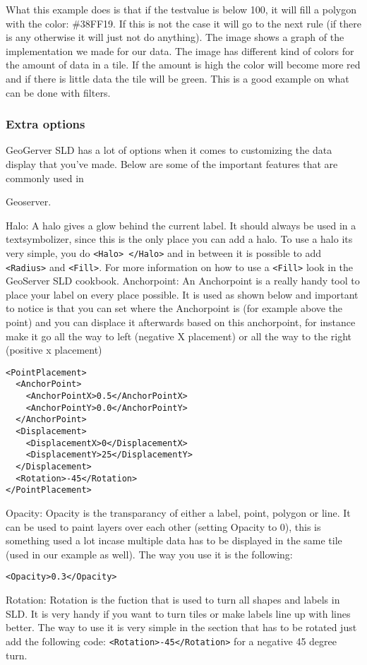 What this example does is that if the testvalue is below 100, it will fill a polygon with the color: \#38FF19. If this is not the case it will go to the next rule (if there is any otherwise it will just not do anything). The image shows a graph of the implementation we made for our data. The image has different kind of colors for the amount of data in a tile. If the amount is high the color will become more red and if there is little data the tile will be green. This is a good example on what can be done with filters.

\subsubsection{Extra options}

GeoGerver SLD has a lot of options when it comes to customizing the data display that you've made. Below are some of the important features that are commonly used in 

Geoserver.

Halo: A halo gives a glow behind the current label. It should always be used in a textsymbolizer, since this is the only place you can add a halo. To use a halo its very simple, you do \lstinline|<Halo> </Halo>| and in between it is possible to add \lstinline|<Radius>| and \lstinline|<Fill>|. For more information on how to use a \lstinline|<Fill>| look in the GeoServer SLD cookbook.
\newline
Anchorpoint: An Anchorpoint is a really handy tool to place your label on every place possible. It is used as shown below and important to notice is that you can set where the Anchorpoint is (for example above the point) and you can displace it afterwards based on this anchorpoint, for instance make it go all the way to left (negative X placement) or all the way to the right (positive x placement)
\begin{lstlisting}
<PointPlacement>
  <AnchorPoint>
    <AnchorPointX>0.5</AnchorPointX>
    <AnchorPointY>0.0</AnchorPointY>
  </AnchorPoint>
  <Displacement>
    <DisplacementX>0</DisplacementX>
    <DisplacementY>25</DisplacementY>
  </Displacement>
  <Rotation>-45</Rotation>
</PointPlacement>
\end{lstlisting}
Opacity: Opacity is the transparancy of either a label, point, polygon or line. It can be used to paint layers over each other (setting Opacity to 0), this is something used a lot incase multiple data has to be displayed in the same tile (used in our example as well). The way you use it is the following:

\lstinline|<Opacity>0.3</Opacity>|

Rotation: Rotation is the fuction that is used to turn all shapes and labels in SLD. It is very handy if you want to turn tiles or make labels line up with lines better. The way to use it is very simple in the section that has to be rotated just add the following code: \lstinline|<Rotation>-45</Rotation>| for a negative 45 degree turn.


